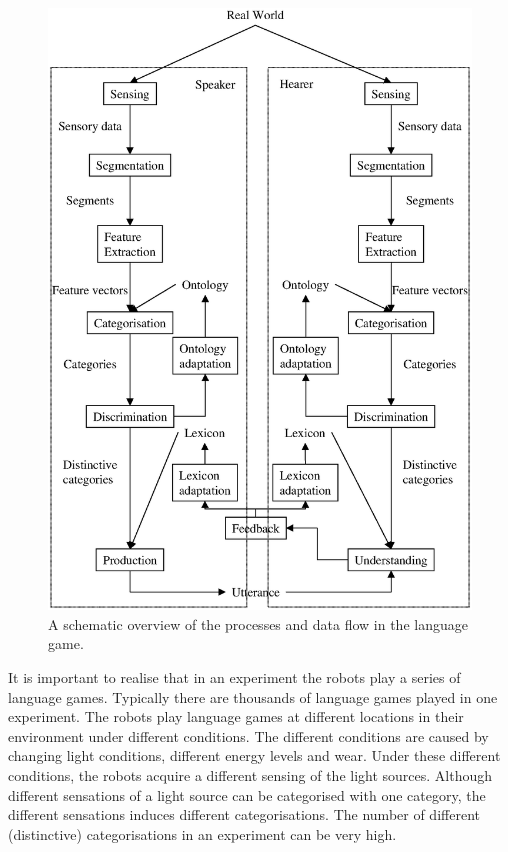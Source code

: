 \begin{figure}[p]
\centerline{\includegraphics[width=12cm]{lang_games/coupling.eps}}
\caption{A schematic overview of the processes and data flow in the language game.}
\label{f:lg:coupling}
\end{figure}


It is important to realise that in an experiment the robots play a series of language games. Typically there are thousands of language games played in one experiment. The robots play language games at different locations in their environment under different conditions. The different conditions are caused by changing light conditions, different energy levels and wear.  Under these different conditions, the robots acquire a different sensing of the light sources. Although different sensations of a light source can be categorised with one category, the different sensations induces different categorisations. The number of different (distinctive) categorisations in an experiment can be very high. 

